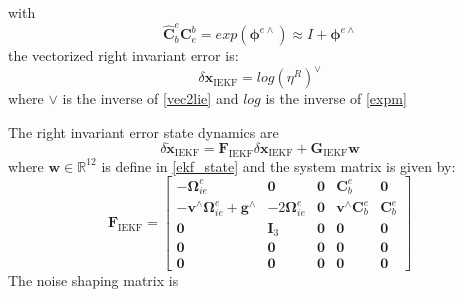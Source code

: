 \documentclass[conference]{IEEEtran}
\begin{document}
with
\begin{equation}
\hat{\mathbf{C}}_{b}^{e}\mathbf{C}_{e}^{b}
=
exp(\boldsymbol{\phi}^{e\wedge})
\approx
I+\boldsymbol{\phi}^{e\wedge}
\end{equation}
the vectorized right invariant error is:
\begin{equation}
\delta\boldsymbol x_{\text{IEKF}}
= log(\eta^{R})^{\vee}
\end{equation}
where \(\vee\) is the inverse of \eqref{vec2lie} and \(log\) is the inverse of \eqref{expm}

The right invariant error state dynamics are
\begin{equation}
  \delta \boldsymbol{\dot{x}}_{\text{IEKF}} = \mathbf{F}_{\text{IEKF}} \delta \boldsymbol{x}_{\text{IEKF}} + \mathbf{G}_{\text{IEKF}} \boldsymbol{w} 
\end{equation}
where \(\boldsymbol{w}\in \mathbb{R}^{12}\) is define in \eqref{ekf_state} and the system matrix is given by:
\begin{equation}
\mathbf F_{\text{IEKF}}
=
\begin{bmatrix}
-\boldsymbol{\Omega}_{ie}^{e}
& \mathbf 0
& \mathbf 0
& \mathbf{C}_b^e
& \mathbf 0
\\
-\boldsymbol v^\wedge\boldsymbol{\Omega}_{ie}^{e}
+\boldsymbol g^\wedge
& -2\boldsymbol{\Omega}_{ie}^{e}
& \mathbf 0
& \boldsymbol v^{\wedge}\mathbf{C}_b^e
& \mathbf{C}_b^e
\\
\mathbf 0
& \mathbf I_3
& \mathbf 0
& \mathbf 0
& \mathbf 0
\\
\mathbf 0
& \mathbf 0
& \mathbf 0
& \mathbf 0
& \mathbf 0
\\
\mathbf 0
& \mathbf 0
& \mathbf 0
& \mathbf 0
& \mathbf 0
\end{bmatrix}
\end{equation}
The noise shaping matrix is
\end{document}
